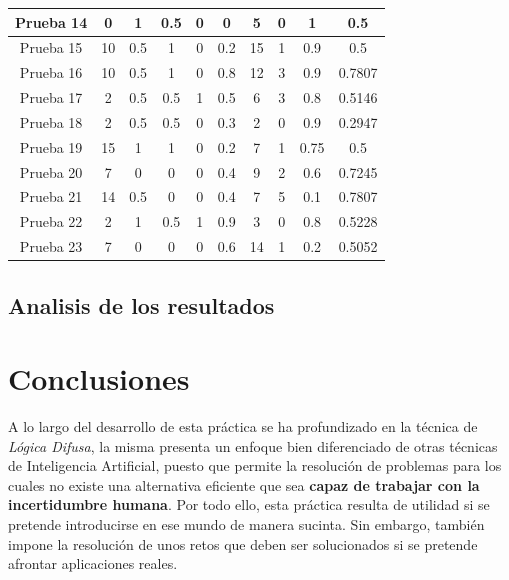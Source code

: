 \documentclass[12pt,a4paper, xcolor=table]{article}
\begin{document}
\begin{center}
\begin{tabular}{c|c|c|c|c|c|c|c|c|c|}
    \multicolumn{1}{|c|}{Prueba 14} & 0 & 1 & 0.5 & 0 & 0 & 5 & 0 & 1 & 0.5 \\ \hline
    \multicolumn{1}{|c|}{Prueba 15} & 10 & 0.5 & 1 & 0 & 0.2 & 15 & 1 & 0.9 & 0.5 \\ \hline
    \multicolumn{1}{|c|}{Prueba 16} & 10 & 0.5 & 1 & 0 & 0.8 & 12 & 3 & 0.9 & 0.7807 \\ \hline
    \multicolumn{1}{|c|}{Prueba 17} & 2 & 0.5 & 0.5 & 1 & 0.5 & 6 & 3 & 0.8 & 0.5146 \\ \hline
    \multicolumn{1}{|c|}{Prueba 18} & 2 & 0.5 & 0.5 & 0 & 0.3 & 2 & 0 & 0.9 & 0.2947 \\ \hline
    \multicolumn{1}{|c|}{Prueba 19} & 15 & 1 & 1 & 0 & 0.2 & 7 & 1 & 0.75 & 0.5 \\ \hline
    \multicolumn{1}{|c|}{Prueba 20} & 7 & 0 & 0 & 0 & 0.4 & 9 & 2 & 0.6 & 0.7245 \\ \hline
    \multicolumn{1}{|c|}{Prueba 21} & 14 & 0.5 & 0 & 0 & 0.4 & 7 & 5 & 0.1 & 0.7807 \\ \hline
    \multicolumn{1}{|c|}{Prueba 22} & 2 & 1 & 0.5 & 1 & 0.9 & 3 & 0 & 0.8 & 0.5228 \\ \hline
    \multicolumn{1}{|c|}{Prueba 23} & 7 & 0 & 0 & 0 & 0.6 & 14 & 1 & 0.2 & 0.5052 \\ \hline
    \end{tabular}
    \end{center}
  
  \subsection{Analisis de los resultados}

\section{Conclusiones}

  A lo largo del desarrollo de esta práctica se ha profundizado en la técnica de \textit{Lógica Difusa}, la misma presenta un enfoque bien diferenciado de otras técnicas de Inteligencia Artificial, puesto que permite la resolución de problemas para los cuales no existe una alternativa eficiente que sea \textbf{capaz de trabajar con la incertidumbre humana}. Por todo ello, esta práctica resulta de utilidad si se pretende introducirse en ese mundo de manera sucinta. Sin embargo, también impone la resolución de unos retos que deben ser solucionados si se pretende afrontar aplicaciones reales. 
  
  \vspace{2mm}
  
\end{document}
